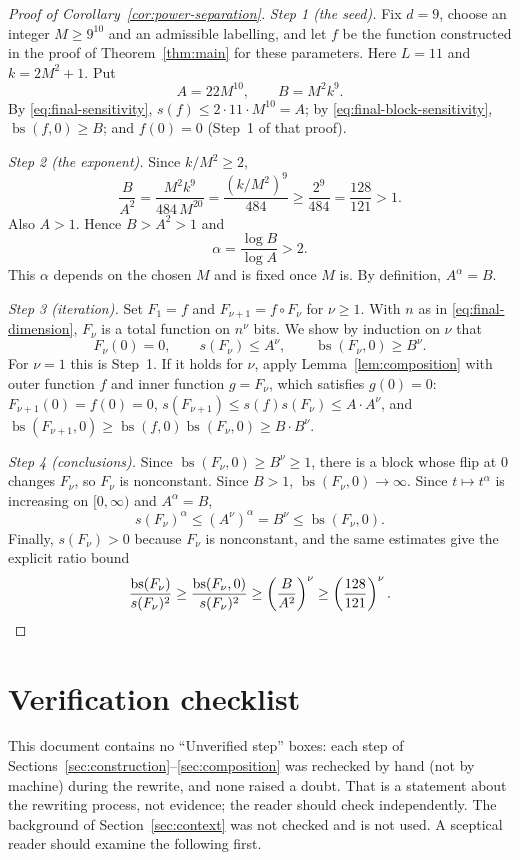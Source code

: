 \documentclass[11pt]{article}
\newcommand{\bs}{\operatorname{bs}}
\theoremstyle{definition}
\theoremstyle{remark}
\begin{document}
\begin{proof}[Proof of Corollary~\ref{cor:power-separation}]
\emph{Step 1 (the seed).} Fix \(d=9\), choose an integer \(M\geq9^{10}\) and
an admissible labelling, and let \(f\) be the function constructed in the
proof of Theorem~\ref{thm:main} for these parameters. Here \(L=11\) and
\(k=2M^2+1\). Put
\[
 A=22M^{10},\qquad B=M^2k^9.
\]
By \eqref{eq:final-sensitivity}, \(s(f)\le 2\cdot11\cdot M^{10}=A\); by
\eqref{eq:final-block-sensitivity}, \(\bs(f,0)\geq B\); and \(f(0)=0\)
(Step~1 of that proof).

\emph{Step 2 (the exponent).} Since \(k/M^2\ge2\),
\[
 \frac{B}{A^2}
   =\frac{M^2k^9}{484\,M^{20}}
   =\frac{(k/M^2)^9}{484}
   \geq\frac{2^9}{484}
   =\frac{128}{121}>1.
\]
Also \(A>1\). Hence \(B>A^2>1\) and
\[
 \alpha=\frac{\log B}{\log A}>2 .
\]
This \(\alpha\) depends on the chosen \(M\) and is fixed once \(M\) is.
By definition, \(A^\alpha=B\).

\emph{Step 3 (iteration).} Set \(F_1=f\) and
\(F_{\nu+1}=f\circ F_\nu\) for \(\nu\ge1\). With \(n\) as in
\eqref{eq:final-dimension}, \(F_\nu\) is a total function on \(n^\nu\) bits.
We show by induction on \(\nu\) that
\[
 F_\nu(0)=0,\qquad s(F_\nu)\leq A^\nu,
 \qquad
 \bs(F_\nu,0)\geq B^\nu.
\]
For \(\nu=1\) this is Step~1. If it holds for \(\nu\), apply
Lemma~\ref{lem:composition} with outer function \(f\) and inner function
\(g=F_\nu\), which satisfies \(g(0)=0\):
\(F_{\nu+1}(0)=f(0)=0\),
\(s(F_{\nu+1})\le s(f)s(F_\nu)\le A\cdot A^\nu\), and
\(\bs(F_{\nu+1},0)\ge\bs(f,0)\bs(F_\nu,0)\ge B\cdot B^\nu\).

\emph{Step 4 (conclusions).} Since \(\bs(F_\nu,0)\ge B^\nu\ge1\), there is a
block whose flip at \(0\) changes \(F_\nu\), so \(F_\nu\) is nonconstant.
Since \(B>1\), \(\bs(F_\nu,0)\to\infty\). Since \(t\mapsto t^\alpha\) is
increasing on \([0,\infty)\) and \(A^\alpha=B\),
\[
 s(F_\nu)^\alpha\leq (A^{\nu})^{\alpha}=B^\nu\leq\bs(F_\nu,0).
\]
Finally, \(s(F_\nu)>0\) because \(F_\nu\) is nonconstant, and the same
estimates give the explicit ratio bound
\[
 \frac{\bs(F_\nu)}{s(F_\nu)^2}
 \geq\frac{\bs(F_\nu,0)}{s(F_\nu)^2}
 \geq\left(\frac{B}{A^2}\right)^\nu
 \geq\left(\frac{128}{121}\right)^\nu.\qedhere
\]
\end{proof}

\section{Verification checklist}
\label{sec:checklist}

This document contains no ``Unverified step'' boxes: each step of
Sections~\ref{sec:construction}--\ref{sec:composition} was rechecked by hand
(not by machine) during the rewrite, and none raised a doubt. That is a
statement about the rewriting process, not evidence; the reader should
check independently. The background of Section~\ref{sec:context} was not
checked and is not used. A sceptical reader should examine the following
first.
\end{document}
